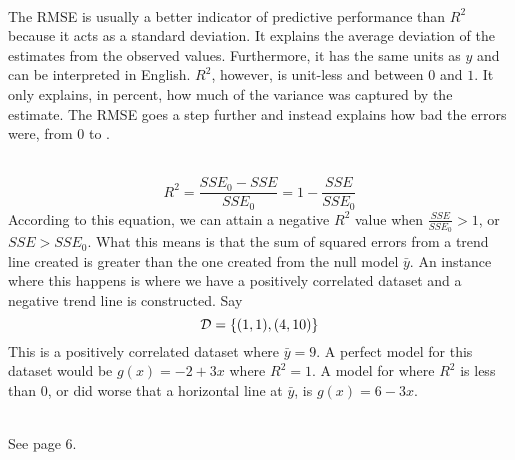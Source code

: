 \documentclass[12pt]{article}
\begin{document}
\begin{enumerate}
 \\
The RMSE is usually a better indicator of predictive performance than $R^2$ because it acts as a standard deviation. It explains the average deviation of the estimates from the observed values. Furthermore, it has the same units as $y$ and can be interpreted in English. $R^2$, however, is unit-less and between $0$ and $1$. It only explains, in percent, how much of the variance was captured by the estimate. The RMSE goes a step further and instead explains how bad the errors were, from $0$ to \qu{$\infty$}. 


 \\
$$R^2 = \frac{SSE_0 - SSE}{SSE_0} = 1  - \frac{SSE}{SSE_0} $$ 
According to this equation, we can attain a negative $R^2$ value when $\frac{SSE}{SSE_0} > 1$, or $SSE > SSE_0$. What this means is that the sum of squared errors from a trend line created is greater than the one created from the null model $\bar{y}$. An instance where this happens is where we have a positively correlated dataset and a negative trend line is constructed. Say $$\mathcal{D} = \left\{ (1,1), (4,10) \right\}$$ 
This is a positively correlated dataset where $\bar{y} = 9$. A perfect model for this dataset would be $g(x) = -2 + 3x$ where $R^2 = 1$. A model for where $R^2$ is less than $0$, or did worse that a horizontal line at $\bar{y}$, is $g(x) = 6 - 3x$. 

 \\ See page $6$. 

 \\


\end{enumerate}
\end{document}
